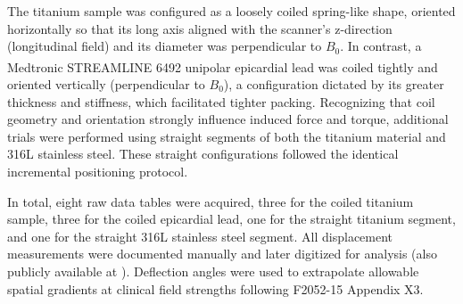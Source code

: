 The titanium sample was configured as a loosely coiled spring-like shape, oriented horizontally so that its long axis aligned with the scanner's z-direction (longitudinal field) and its diameter was perpendicular to $B_0$. In contrast, a Medtronic STREAMLINE\textsuperscript{\texttrademark} 6492 unipolar epicardial lead was coiled tightly and oriented vertically (perpendicular to $B_0$), a configuration dictated by its greater thickness and stiffness, which facilitated tighter packing. Recognizing that coil geometry and orientation strongly influence induced force and torque, additional trials were performed using straight segments of both the titanium material and 316L stainless steel. These straight configurations followed the identical incremental positioning protocol. 


In total, eight raw data tables were acquired, three for the coiled titanium sample, three for the coiled epicardial lead, one for the straight titanium segment, and one for the straight 316L stainless steel segment. All displacement measurements were documented manually and later digitized for analysis (also publicly available at \cite{juarezluna2025mrisafety}). Deflection angles were used to extrapolate allowable spatial gradients at clinical field strengths following F2052-15 Appendix X3.

